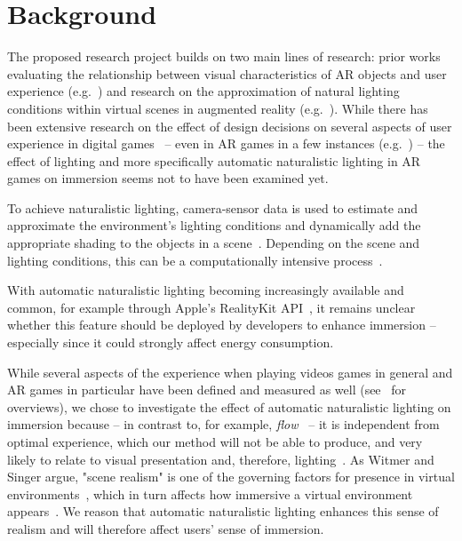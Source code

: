 \documentclass[12pt,twoside,english]{article}
\begin{document}
\section{Background}
\label{sect:background}
The proposed research project builds on two main lines of research: prior works evaluating the relationship between visual characteristics of \gls{AR} objects and user experience (e.g.~\cite{gabbard_effects_2006}) and research on the approximation of natural lighting conditions within virtual scenes in augmented reality (e.g.~\cite{aittala_inverse_2010}).
While there has been extensive research on the effect of design decisions on several aspects of user experience in digital games~\cite{johnson_validation_2018} -- even in \gls{AR} games in a few instances (e.g.~\cite{georgiou_development_2017}) -- the effect of lighting and more specifically automatic naturalistic lighting in \gls{AR} games on immersion seems not to have been examined yet.

To achieve naturalistic lighting, camera-sensor data is used to estimate and approximate the environment's lighting conditions and dynamically add the appropriate shading to the objects in a scene~\cite{apple_arlightestimate_nodate,apple_pointlight_nodate}.
Depending on the scene and lighting conditions, this can be a computationally intensive process~\cite{steed_constructing_2016}.

With automatic naturalistic lighting becoming increasingly available and common, for example through Apple's RealityKit API~\cite{apple_realitykit_nodate}, it remains unclear whether this feature should be deployed by developers to enhance immersion -- especially since it could strongly affect energy consumption.

While several aspects of the experience when playing videos games in general and \gls{AR} games in particular have been defined and measured as well (see~\cite{dey_systematic_2018, dunser_survey_2008} for overviews), we chose to investigate the effect of automatic naturalistic lighting on immersion because -- in contrast to, for example, \textit{flow}~\cite{csikszentmihalyi_flow_1990} -- it is independent from optimal experience, which our method will not be able to produce, and very likely to relate to visual presentation and, therefore, lighting~\cite{jennett_measuring_2008}.
As Witmer and Singer argue, "scene realism" is one of the governing factors for presence in virtual environments~\cite{witmer_measuring_1998}, which in turn affects how immersive a virtual environment appears~\cite{jennett_measuring_2008}.
We reason that automatic naturalistic lighting enhances this sense of realism and will therefore affect users' sense of immersion.
\end{document}

